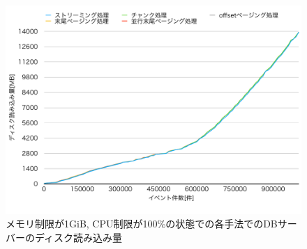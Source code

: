 \documentclass[../../../main]{subfiles}
\begin{document}
    \begin{figure}[H]
        \centering
        \includegraphics[width=12cm]{graph}
        \caption{メモリ制限が1GiB, CPU制限が100\%の状態での各手法でのDBサーバーのディスク読み込み量}
        \label{fig:app-disk-out}
    \end{figure}
\end{document}
